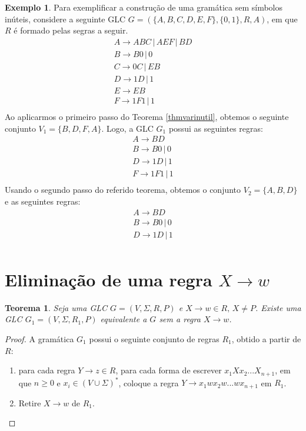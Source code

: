 \documentclass[a4paper]{article}
\newtheorem{Theorem}{Teorema}
\theoremstyle{definition}
\newtheorem{Example}{Exemplo}
\begin{document}
  \begin{Example}
    Para exemplificar a construção de uma gramática sem símbolos inúteis,
    considere a seguinte GLC $G = (\{A,B,C,D,E,F\},\{0,1\},R,A)$, em que $R$ é
    formado pelas segras a seguir.
    \[
      \begin{array}{l}
        A \to ABC \,|\, AEF\,|\,BD\\
        B \to B0 \,|\,0\\
        C \to 0C\,|\,EB\\
        D \to 1D\,|\,1\\
        E \to EB \\
        F \to 1F1\,|\,1\\
      \end{array}
    \]
    Ao aplicarmos o primeiro passo do Teorema \ref{thmvarinutil}, obtemos o
    seguinte conjunto $V_1 =\{B,D,F,A\}$. Logo, a GLC $G_1$ possui as seguintes
    regras:
    \[
      \begin{array}{l}
        A \to BD\\
        B \to B0 \,|\,0\\
        D \to 1D\,|\,1\\
        F \to 1F1\,|\,1\\
      \end{array}
    \]
    Usando o segundo passo do referido teorema, obtemos o conjunto $V_2
    =\{A,B,D\}$ e as seguintes regras:
    \[
      \begin{array}{l}
        A \to BD\\
        B \to B0 \,|\,0\\
        D \to 1D\,|\,1\\
      \end{array}
    \]   
  \end{Example}

  \section{Eliminação de uma regra $X \to w$}

  \begin{Theorem}
    Seja uma GLC $G = (V,\Sigma,R,P)$ e $X \to w \in R,\, X\neq P$. Existe uma
    GLC $G_1 = (V, \Sigma, R_1, P)$ equivalente a $G$ sem a regra $X \to w$.
  \end{Theorem}
  \begin{proof}
    A gramática $G_1$ possui o seguinte conjunto de regras $R_1$, obtido a
    partir de $R$:
    \begin{enumerate}
    \item para cada regra $Y \to z \in R$, para cada forma de escrever
      $x_1Xx_2...X_{n + 1}$, em que $n\geq 0$ e $x_i \in (V\cup \Sigma)^*$,
      coloque a regra $Y \to x_1wx_2w...wx_{n+1}$ em $R_1$.
    \item Retire $X \to w$ de $R_1$.
    \end{enumerate}
  \end{proof}
\end{document}
